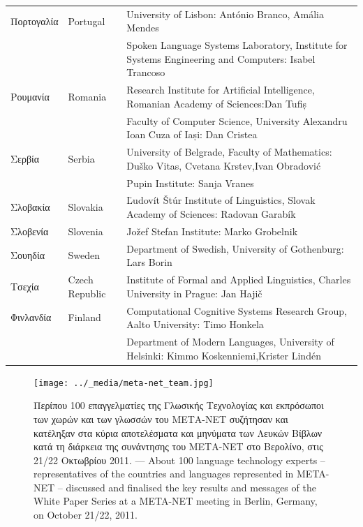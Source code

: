 \documentclass[]{../../metanetpaper}
\begin{document}
\begin{longtable}{@{}llp{113mm}@{}}
  Πορτογαλία & \textcolor{grey1}{Portugal} & University of Lisbon: António Branco, Amália Mendes \\ \addlinespace
  & & Spoken Language Systems Laboratory, Institute for Systems Engineering and Computers: Isabel Trancoso \\ \addlinespace
  Ρουμανία & \textcolor{grey1}{Romania} & Research Institute for Artificial Intelligence, Romanian Academy of Sciences:\newline Dan Tufiș \\ \addlinespace
  & & Faculty of Computer Science, University Alexandru Ioan Cuza of Iași: Dan Cristea \\ \addlinespace
  Σερβία & \textcolor{grey1}{Serbia} & University of Belgrade, Faculty of Mathematics: Duško Vitas, Cvetana Krstev,\newline Ivan Obradović \\ \addlinespace
  & & Pupin Institute: Sanja Vranes \\ \addlinespace  
  Σλοβακία & \textcolor{grey1}{Slovakia} & Ľudovít Štúr Institute of Linguistics, Slovak Academy of Sciences: Radovan Garabík \\ \addlinespace 
  Σλοβενία & \textcolor{grey1}{Slovenia} & Jožef Stefan Institute: Marko Grobelnik \\ \addlinespace 
  Σουηδία & \textcolor{grey1}{Sweden} & Department of Swedish, University of Gothenburg: Lars Borin \\ \addlinespace 
  Τσεχία & \textcolor{grey1}{Czech Republic} & Institute of Formal and Applied Linguistics, Charles University in Prague: Jan Hajič \\ \addlinespace
  Φινλανδία & \textcolor{grey1}{Finland} & Computational Cognitive Systems Research Group, Aalto University: Timo Honkela\\ \addlinespace
  & & Department of Modern Languages, University of Helsinki: Kimmo Koskenniemi,\newline Krister Lindén 
\end{longtable}
\normalsize

\renewcommand*{\figureformat}{}
\renewcommand*{\captionformat}{}

\begin{figure}[htbp]
  \center
  \texttt{[image: ../\_media/meta-net\_team.jpg]}
  \caption{Περίπου 100 επαγγελματίες της Γλωσικής Τεχνολογίας και εκπρόσωποι των χωρών και των γλωσσών του ΜΕΤΑ-ΝΕΤ συζήτησαν και κατέληξαν στα κύρια αποτελέσματα και μηνύματα των Λευκών Βίβλων κατά τη διάρκεια της συνάντησης του ΜΕΤΑ-ΝΕΤ στο Βερολίνο, στις 21/22 Οκτωβρίου 2011. --- \textcolor{grey1}{About 100 language technology experts -- representatives of the countries and languages represented in META-NET -- discussed and finalised the key results and messages of the White Paper Series at a META-NET meeting in Berlin, Germany, on October 21/22, 2011.}}
  \medskip
\end{figure}
\end{document}
